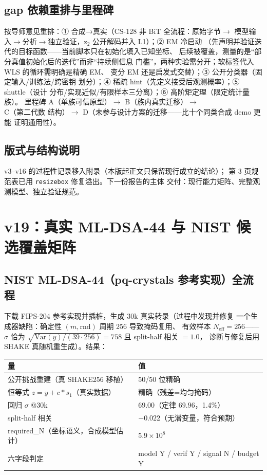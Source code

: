 \documentclass[11pt,a4paper]{ctexart}
\begin{document}
\subsection{gap 依赖重排与里程碑}

按导师意见重排：① 合成→真实（CS-128 非 BiT 全流程：原始字节$\to$
模型输入$\to$分析$\to$独立验证，z$_2$ 公开解码并入 L1）；② EM 冷启动
（先声明并验证迭代的目标函数——当前脚本只在初始化填入已知坐标、
后续被覆盖，测量的是``部分真值初始化后的迭代''而非``持续侧信息
门槛''，两种实验需分开；软标签代入 WLS 的循环需明确是精确 EM、
变分 EM 还是启发式交替）；③ 公开分类器（固定输入/训练法/跨密钥
划分）；④ 稀疏 hint（先定义接受后观测概率）；⑤ shuttle（设计
分布/实现近似/有限样本三分离）；⑥ 高阶矩定理（限定统计量族）。
里程碑 A（单族可信原型）$\to$ B（族内真实迁移）$\to$ C（第二代数
结构）$\to$ D（未参与设计方案的迁移——比十个同类合成 demo 更能
证明通用性）。

\subsection{版式与结构说明}

v3--v16 的过程性记录移入附录（本版起正文只保留现行成立的结论）；
第 3 页规范表已用 \texttt{resizebox} 修复溢出。下一份报告的主体
交付：现行能力矩阵、完整观测模型、独立验证规范。



\section{v19：真实 ML-DSA-44 与 NIST 候选覆盖矩阵}

\subsection{NIST ML-DSA-44（pq-crystals 参考实现）全流程}

下载 FIPS-204 参考实现并插桩，生成 30k 真实转录（过程中发现并修复
一个生成器缺陷：确定性 $(m,\mathrm{rnd})$ 周期 256 导致掩码复用、
有效样本 $N_{\mathrm{eff}}{=}256$——$\sigma$ 恰为
$\sqrt{\mathrm{Var}(y)/(39\cdot256)}=758$ 且 split-half 相关 $=1.0$，
诊断与修复后用 SHAKE 真随机重生成）。结果：

\begin{table}[htbp]\centering\small
\begin{tabular}{@{}ll@{}}
\toprule
量 & 值 \\
\midrule
公开挑战重建（真 SHAKE256 移植） & 50/50 位精确 \\
恒等式 $z=y+c{\ast}s_1$（真实数据） & 精确（残差=均匀掩码） \\
回归 $\sigma$ @30k & $69.00$（定律 $69.96$，1.4\%） \\
split-half 相关 & $-0.022$（无潜变量，符合预期） \\
required\_N（坐标语义，合成模型估计） & $5.9\times10^8$ \\
六字段判定 & model Y / verif Y / signal N / budget Y \\
\bottomrule
\end{tabular}
\end{table}
\end{document}
